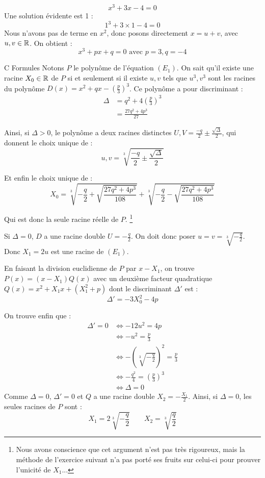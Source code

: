 \documentclass[]{../templates/homework}
\begin{document}
$$ x^3 + 3x - 4 = 0$$
\question Une solution évidente est 1 : $$1^3 + 3\times1 - 4 = 0$$
\question Nous n'avons pas de terme en $x^2$, donc posons directement $x = u+v$, avec $u, v \in \mathbb R$.
On obtient : $$x^3 + px + q = 0 \text{ avec } p=3, q=-4$$

\partie C {Formules}
 Notons $P$ le polynôme de l'équation $(E_1)$. On sait qu'il existe une racine $X_0 \in \mathbb R$ de $P$ si et seulement si il existe $u,v$ tels que $u^3,v^3$ sont les racines du polynôme $D(x) = x^2 + qx - \left(\frac p 3\right)^3$.
Ce polynôme a pour discriminant :
\begin{align*}
	\Delta &= q^2 + 4\left(\frac p 3\right)^3 \\
	&=  \frac {27q^2 + 4p^3}{27}
\end{align*}


Ainsi, si $\Delta > 0$, le polynôme a deux racines distinctes $U,V = \frac {-q}{2} \pm \frac {\sqrt \Delta} {2}$, qui donnent le choix unique de :
$$u,v = \sqrt[3]{\frac {-q}{2} \pm \frac {\sqrt \Delta} {2}}$$

Et enfin le choix unique de :
$$X_0 = \sqrt[3]{-\frac {q}{2} + \sqrt {\frac {27q^2 + 4p^3}{108}} } + \sqrt[3]{-\frac {q}{2} - \sqrt {\frac {27q^2 + 4p^3}{108}} }$$

Qui est donc la seule racine réelle de $P$. \footnote{Nous avons conscience que cet argument n'est pas très rigoureux, mais la méthode de l'exercice suivant n'a pas porté ses fruits sur celui-ci pour prouver l'unicité de $X_1$...}

\subproblem Si $\Delta = 0$, $D$ a une racine double $U = -\frac q {2}$. On doit donc poser $u = v = \sqrt[3]{-\frac q 2}$. Donc $X_1 = 2u$ est une racine de $(E_1)$.


En faisant la division euclidienne de $P$ par $x-X_1$, on trouve $P(x) = (x-X_1)Q(x)$ avec un deuxième facteur quadratique $Q(x) = x^2 + X_1x + (X_1^2 + p)$ dont le discriminant $\Delta'$ est :
$$\Delta' = -3X_0^2 - 4p$$

On trouve enfin que :
\begin{align*}
	\Delta' = 0 &\iff -12u^2 = 4p \\
	&\iff -u^2 = \frac p 3\\
	&\iff -(\sqrt[3]{-\frac q 2})^2 = \frac p3\\
	&\iff -\frac {q^2} 4 = (\frac p 3)^3\\
	&\iff \Delta = 0
\end{align*}
Comme $\Delta = 0$, $\Delta' = 0$ et $Q$ a une racine double $X_2 = -\frac {X_1} 2$.
Ainsi, si $\Delta = 0$, les seules racines de $P$ sont :
\begin{equation*}
	X_1 = 2\sqrt[3]{-\frac q 2} \qquad X_2 = \sqrt[3]{\frac q 2}
\end{equation*}
\end{document}
